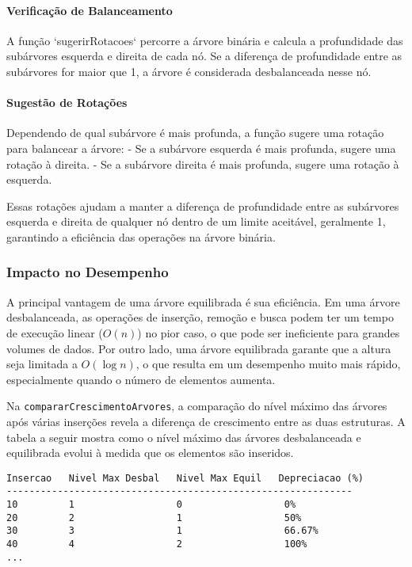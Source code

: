 \documentclass{article}
\begin{document}
\paragraph{Verificação de Balanceamento}
A função `sugerirRotacoes` percorre a árvore binária e calcula a profundidade das subárvores esquerda e direita de cada nó. Se a diferença de profundidade entre as subárvores for maior que 1, a árvore é considerada desbalanceada nesse nó.

\paragraph{Sugestão de Rotações}
Dependendo de qual subárvore é mais profunda, a função sugere uma rotação para balancear a árvore:
- Se a subárvore esquerda é mais profunda, sugere uma rotação à direita.
- Se a subárvore direita é mais profunda, sugere uma rotação à esquerda.

Essas rotações ajudam a manter a diferença de profundidade entre as subárvores esquerda e direita de qualquer nó dentro de um limite aceitável, geralmente 1, garantindo a eficiência das operações na árvore binária.

\subsubsection{Impacto no Desempenho}
A principal vantagem de uma árvore equilibrada é sua eficiência. Em uma árvore desbalanceada, as operações de inserção, remoção e busca podem ter um tempo de execução linear (\(O(n)\)) no pior caso, o que pode ser ineficiente para grandes volumes de dados. Por outro lado, uma árvore equilibrada garante que a altura seja limitada a \(O(\log n)\), o que resulta em um desempenho muito mais rápido, especialmente quando o número de elementos aumenta.

Na \texttt{compararCrescimentoArvores}, a comparação do nível máximo das árvores após várias inserções revela a diferença de crescimento entre as duas estruturas. A tabela a seguir mostra como o nível máximo das árvores desbalanceada e equilibrada evolui à medida que os elementos são inseridos.

\begin{verbatim}
Insercao   Nivel Max Desbal   Nivel Max Equil   Depreciacao (%)
-------------------------------------------------------------
10         1                  0                  0%
20         2                  1                  50%
30         3                  1                  66.67%
40         4                  2                  100%
...
\end{verbatim}
\end{document}
